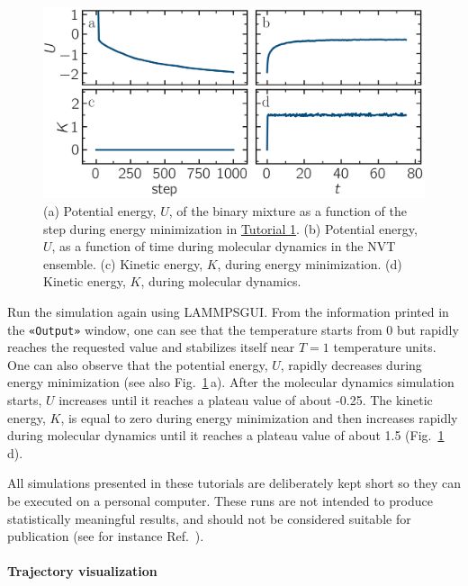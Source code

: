 \documentclass[9pt,tutorial]{livecoms}
\newcommand{\guicmd}[1]{\textcolor{command}{\texttt{«#1»}}} %
\newcommand{\lammpsgui}{\textsf{LAMMPS\textendash GUI}}
\begin{document}
\begin{figure}
\centering
\includegraphics[width=\linewidth]{LJ-energy}
\caption{(a) Potential energy, $U$, of the binary mixture as a function of the
step during energy minimization in \hyperref[lennard-jones-label]{Tutorial 1}.
(b) Potential energy, $U$, as a function of time during molecular dynamics in
the NVT ensemble.  (c) Kinetic energy, $K$, during energy minimization.
(d) Kinetic energy, $K$, during molecular dynamics.}
\label{fig:evolution-energy}
\end{figure}

Run the simulation again using \lammpsgui{}.  From the information
printed in the \guicmd{Output} window, one can see that the temperature
starts from 0 but rapidly reaches the requested value and
stabilizes itself near $T=1$ temperature units.  One can also observe that
the potential energy, $U$, rapidly decreases during energy
minimization (see also Fig.~\ref{fig:evolution-energy}\,a).  After
the molecular dynamics simulation starts, $U$ increases until
it reaches a plateau value of about -0.25.  The kinetic energy,
$K$, is equal to zero during energy minimization and then
increases rapidly during molecular dynamics until it reaches
a plateau value of about 1.5 (Fig.~\ref{fig:evolution-energy}\,d).

\begin{note}
  All simulations presented in these tutorials are deliberately kept
  short so they can be executed on a personal computer.  These runs are not intended
  to produce statistically meaningful results, and should not be considered suitable
  for publication (see for instance Ref.~).
\end{note}

\paragraph{Trajectory visualization}
\end{document}
